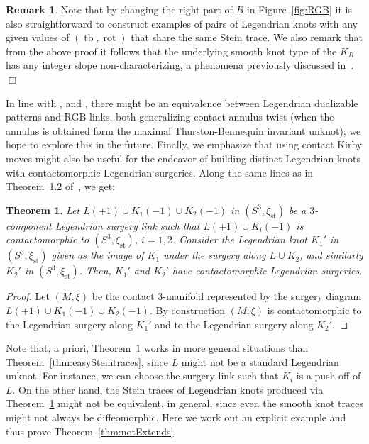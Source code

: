 \documentclass[11pt]{amsart} %
\DeclareMathOperator{\tb}{tb}
\DeclareMathOperator{\rot}{rot}
\newcommand{\xist}{\xi_{\mathrm{st}}}
\theoremstyle{plain}
\newtheorem{thm}[Theorem]{Theorem}
\theoremstyle{definition}
\newtheorem{rem}[Theorem]{Remark}
\begin{document}
\begin{rem}
	Note that by changing the right part of $B$ in Figure~\ref{fig:RGB} it is also straightforward to construct examples of pairs of Legendrian knots with any given values of $(\tb,\rot)$ that share the same Stein trace. We also remark that from the above proof it follows that the underlying smooth knot type of the $K_B$ has any integer slope non-characterizing, a phenomena previously discussed in~\cite{BakerMotegi18}.\hfill$\Box$
\end{rem}


In line with \cite{Tagami1}, and \cite[Theorem 4.8]{Tagami1}, there might be an equivalence between Legendrian dualizable patterns and RGB links, both generalizing contact annulus twist (when the annulus is obtained form the maximal Thurston-Bennequin invariant unknot); we hope to explore this in the future. Finally, we emphasize that using contact Kirby moves might also be useful for the endeavor of building distinct Legendrian knots with contactomorphic Legendrian surgeries. Along the same lines as in Theorem~1.2 of~\cite{ManolescuPiccirillo21}, we get:

\begin{thm}\label{thm:easy0surgery}
Let $L(+1)\cup K_1(-1)\cup K_2(-1)$ in $(S^3,\xist)$ be a $3$-component Legendrian surgery link such that $L(+1)\cup K_i(-1)$ is contactomorphic to $(S^3,\xist)$, $i=1,2$. Consider the Legendrian knot $ K_1'$ in $(S^3,\xist)$ given as the image of $K_1$ under the surgery along $L\cup K_2$, and similarly $K_2'$ in $(S^3,\xist)$. Then, $K_1'$ and $K_2'$ have contactomorphic Legendrian surgeries.
\end{thm}

\begin{proof}
Let $(M,\xi)$ be the contact 3-manifold represented by the surgery diagram $L(+1)\cup K_1(-1)\cup K_2(-1)$. By construction $(M,\xi)$ is contactomorphic to the Legendrian surgery along $K_1'$ and to the Legendrian surgery along $K_2'$.
\end{proof}

Note that, a priori, Theorem~\ref{thm:easy0surgery} works in more general situations than Theorem~\ref{thm:easySteintraces}, since $L$ might not be a standard Legendrian unknot. For instance, we can choose the surgery link such that $K_i$ is a push-off of $L$. On the other hand, the Stein traces of Legendrian knots produced via Theorem~\ref{thm:easy0surgery} might not be equivalent, in general, since even the smooth knot traces might not always be diffeomorphic. Here we work out an explicit example and thus prove Theorem~\ref{thm:notExtends}.
\end{document}
